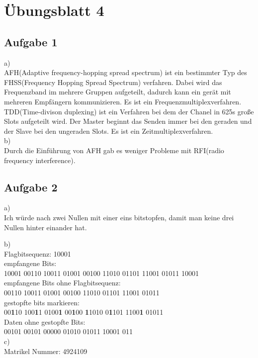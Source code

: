 \documentclass[12pt,a4paper,headsepline]{scrreprt}
\begin{document}


\section*{Übungsblatt 4}

\subsection*{Aufgabe 1}
a)\\
AFH(Adaptive frequency-hopping spread spectrum) ist ein bestimmter Typ des FHSS(Frequency Hopping Spread Spectrum) verfahren. Dabei wird das Frequenzband im mehrere Gruppen aufgeteilt, dadurch kann ein gerät mit mehreren Empfängern kommunizieren. Es ist ein Frequenzmultiplexverfahren.\\

TDD(Time-divison duplexing) ist ein Verfahren bei dem der Chanel in 625\textmu s große Slots aufgeteilt wird. Der Master beginnt das Senden immer bei den geraden und der Slave bei den ungeraden Slots. Es ist ein Zeitmultiplexverfahren.\\

b)\\
Durch die Einführung von AFH gab es weniger Probleme mit RFI(radio frequency interference).

\subsection*{Aufgabe 2}
a)\\
Ich würde nach zwei Nullen mit einer eins bitstopfen, damit man keine drei Nullen hinter einander hat.

b)\\
Flagbitsequenz: 10001\\

empfangene Bits:\\10001 00110 10011 01001 00100 11010 01101 11001 01011 10001\\

empfangene Bits ohne Flagbitsequenz:\\00110 10011 01001 00100 11010 01101 11001 01011\\

gestopfte bits markieren:\\00\textbf{1}10 100\textbf{1}1 0100\textbf{1} 00\textbf{1}00 \textbf{1}1010 0\textbf{1}101 1100\textbf{1} 01011\\

Daten ohne gestopfte Bits:\\00101 00101 00000 01010 01011 10001 011\\
\clearpage
c)\\
Matrikel Nummer: 4924109\\
\end{document}
